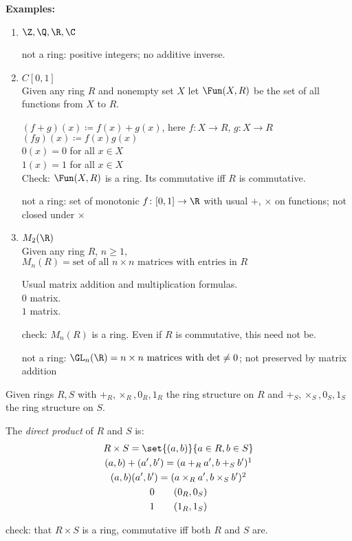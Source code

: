 \textbf{Examples:}
\begin{enumerate}
\item[] $\Z,\Q,\R,\C$

not a ring: positive integers; no additive inverse.
\item[] $C[0,1]$ \\
 Given any ring $R$ and nonempty set $X$ let $\Fun(X,R)$ be the set of all functions from $X$ to $R$.

$(f+g)(x) \coloneqq f(x)+g(x)$, here $f\colon X\to R$, $g\colon X\to R$ \\
$(fg)(x) \coloneqq f(x)g(x)$ \\
$0(x) = 0$ for all $x\in X$ \\
$1(x) = 1$ for all $x\in X$ \\
Check: $\Fun(X,R)$ is a ring.  Its commutative iff $R$ is commutative.

not a ring: set of monotonic $f\colon[0,1]\to\R$ with usual $+$, $\times$ on functions; not closed under $\times$
\item[] $M_2(\R)$ \\
 Given any ring $R$, $n\geq1$, $M_n(R)=\text{set of all $n\times n$ matrices with entries in $R$}$

Usual matrix addition and multiplication formulas. \\
$0$ matrix. \\
$1$ matrix.

check: $M_n(R)$ is a ring.  Even if $R$ is commutative, this need not be.

not a ring: $\GL_n(\R)=\text{$n\times n$ matrices with $\det\neq0$}$; not preserved by matrix addition
\end{enumerate}
Given rings $R,S$ with $+_R,\times_R,0_R,1_R$ the ring structure on $R$ and $+_S,\times_S,0_S,1_S$ the ring structure on $S$.

The \emph{direct product} of $R$ and $S$ is:
\begin{gather*}
R\times S = \set{(a,b)}{a\in R, b\in S} \\
(a,b)+(a',b') = (a+_Ra',b+_Sb')\footnotemark \\
(a,b)(a',b') = (a\times_Ra',b\times_Sb')\footnotemark \\
0 \qquad (0_R,0_S) \\
1 \qquad (1_R,1_S)
\end{gather*}\addtocounter{footnote}{-1}\addtocounter{footnote}{1}%
check: that $R\times S$ is a ring, commutative iff both $R$ and $S$ are.

